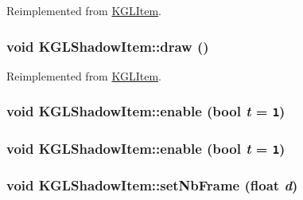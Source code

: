 Reimplemented from \hyperlink{class_k_g_l_item_4e4766cf0362fa050bffdf5f45d6d13f}{KGLItem}.\hypertarget{class_k_g_l_shadow_item_97433b863559d8f38199fe68a5b21bcc}{
\subsubsection[{draw}]{\setlength{\rightskip}{0pt plus 5cm}void KGLShadowItem::draw ()}}
\label{class_k_g_l_shadow_item_97433b863559d8f38199fe68a5b21bcc}




Reimplemented from \hyperlink{class_k_g_l_item_4e4766cf0362fa050bffdf5f45d6d13f}{KGLItem}.\hypertarget{class_k_g_l_shadow_item_936437c9a0cf323cb580e0697fd10b6e}{
\subsubsection[{enable}]{\setlength{\rightskip}{0pt plus 5cm}void KGLShadowItem::enable (bool {\em t} = {\tt 1})}}
\label{class_k_g_l_shadow_item_936437c9a0cf323cb580e0697fd10b6e}


\hypertarget{class_k_g_l_shadow_item_936437c9a0cf323cb580e0697fd10b6e}{
\subsubsection[{enable}]{\setlength{\rightskip}{0pt plus 5cm}void KGLShadowItem::enable (bool {\em t} = {\tt 1})}}
\label{class_k_g_l_shadow_item_936437c9a0cf323cb580e0697fd10b6e}


\hypertarget{class_k_g_l_shadow_item_b337d40ec80798586d13a96d648c5b6c}{
\subsubsection[{setNbFrame}]{\setlength{\rightskip}{0pt plus 5cm}void KGLShadowItem::setNbFrame (float {\em d})}}
\label{class_k_g_l_shadow_item_b337d40ec80798586d13a96d648c5b6c}


